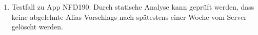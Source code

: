 \begin{enumerate}[label=\textbf{/T\arabic*0/}, align=left]
	\item Testfall zu App NFD190: Durch \gls{statische Analyse} kann geprüft werden, dass keine abgelehnte \Glspl{Alias-Vorschlag} nach spätestens einer Woche vom \Gls{Server} gelöscht werden.
\end{enumerate}